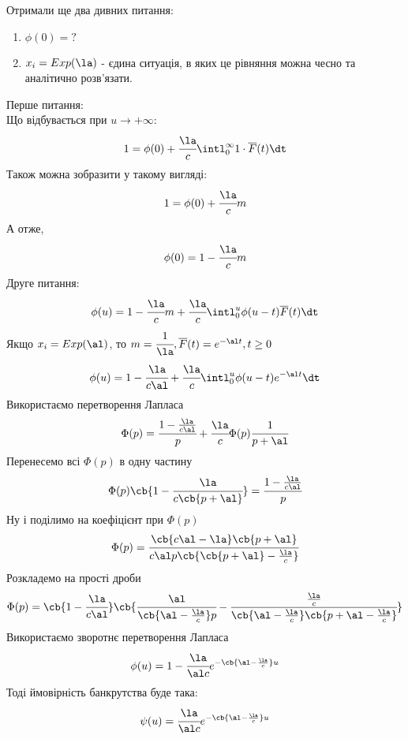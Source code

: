 Отримали ще два дивних питання:
\begin{enumerate}
\item $\phi(0)=?$
\item $x_i = Exp(\la)$ - єдина ситуація, в яких це рівняння можна чесно та аналітично розв’язати.
\end{enumerate}
Перше питання:\\
Що відбувається при $u\to+\infty:$
\begin{equation}
	1 = \phi(0) +\cfrac\la c \intl_0^\infty 1 \cdot \overline{F}(t)\dt
\end{equation}
Також можна зобразити у такому вигляді:
\begin{equation}
	1 = \phi(0) + \cfrac\la c m
\end{equation}
А отже,
\begin{equation}
	\phi(0) = 1 - \cfrac\la c m
\end{equation}
Друге питання:
\begin{equation}
	\phi(u) = 1 -\cfrac\la c m + \cfrac\la c \intl_0^u \phi(u-t) \overline{F}(t)\dt 
\end{equation}
Якщо $x_i=Exp(\al)$, то $m=\cfrac1\la, \overline{F}(t) = e^{-\al t},t\geq 0$
\begin{equation}
	\phi(u) = 1 - \cfrac{\la}{c\al} + \cfrac\la c \intl_0^u \phi(u-t) e^{-\al t} \dt
\end{equation}
Використаємо перетворення Лапласа
\begin{equation}
	\Phi(p) = \cfrac{1-\frac{\la}{c\al}}p +\cfrac\la c \Phi(p) \cfrac1{p+\al} 
\end{equation}
Перенесемо всі $\Phi(p)$ в одну частину
\begin{equation}
	\Phi(p) \cb{1 - \cfrac{\la}{c\cb{p+\al}}} = \cfrac{1-\frac{\la}{c\al}}p
\end{equation}
Ну і поділимо на коефіцієнт при $\Phi(p)$
\begin{equation}
	\Phi(p) = \cfrac{\cb{c\al -\la}  \cb{p+\al}}{c \al p\cb{\cb{p+\al} -\frac\la c}}
\end{equation}
Розкладемо на прості дроби
\begin{equation}
	\Phi(p) = \cb{1 - \cfrac{\la}{c\al}} \cb{ \cfrac{\al}{\cb{\al - \frac\la c}p} - \cfrac{\frac\la c}{\cb{\al - \frac\la c}\cb{p +\al  - \frac\la c}} }
\end{equation}
Використаємо зворотнє перетворення Лапласа
\begin{equation}
	\phi(u) = 1 - \cfrac{\la}{\al c} e^{-\cb{\al - \frac\la c}u}
\end{equation}
Тоді ймовірність банкрутства буде така:
\begin{equation}
	\psi(u) = \cfrac{\la}{\al c} e^{-\cb{\al - \frac\la c}u}
\end{equation}